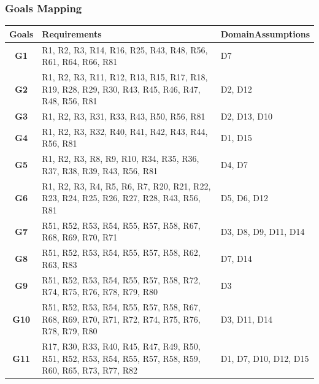\documentclass{Configuration_Files/PoliMi3i_thesis}
\begin{document}
\subsubsection{Goals Mapping}

\begin{table}[H]
    \begin{xltabular}{\textwidth}{| >{}c|X|X|}
    \hline
    \textbf{Goals}&\textbf{Requirements}&\textbf{DomainAssumptions}\T\B\\
    \hline
    \textbf{G1}
    & %
    R1, R2, R3, R14, R16, R25, R43, R48, R56, R61, R64, R66, R81
    & %
    D7\T\B\\
    \hline
    \textbf{G2}
    & %
    R1, R2, R3, R11, R12, R13, R15, R17, R18, R19, R28, R29, R30, R43, R45, R46, R47, R48, R56, R81
    & %
    D2, D12\T\B\\
    \hline
    \textbf{G3}
    & %
    R1, R2, R3, R31, R33, R43, R50, R56, R81
    & %
    D2, D13, D10 \T\B\\
    \hline
    \textbf{G4}
    & %
    R1, R2, R3, R32, R40, R41, R42, R43, R44, R56, R81
    & %
    D1, D15 \T\B\\
    \hline
    \textbf{G5}
    & %
    R1, R2, R3, R8, R9, R10, R34, R35, R36, R37, R38, R39, R43, R56, R81
    & %
    D4, D7\T\B\\
    \hline
    \textbf{G6}
    & %
    R1, R2, R3, R4, R5, R6, R7, R20, R21, R22, R23, R24, R25, R26, R27, R28, R43, R56, R81
    & %
    D5, D6, D12\T\B\\
    \hline
    \textbf{G7}
    & %
    R51, R52, R53, R54, R55, R57, R58, R67, R68, R69, R70, R71
    & %
    D3, D8, D9, D11, D14\T\B\\
    \hline
    \textbf{G8}
    & %
    R51, R52, R53, R54, R55, R57, R58, R62, R63, R83
    & %
    D7, D14 \T\B\\
    \hline
    \textbf{G9}
    & %
    R51, R52, R53, R54, R55, R57, R58, R72, R74, R75, R76, R78, R79, R80
    & %
    D3 \T\B\\
    \hline
    \textbf{G10}
    & %
    R51, R52, R53, R54, R55, R57, R58, R67, R68, R69, R70, R71, R72, R74, R75, R76, R78, R79, R80
    & %
    D3, D11, D14 \T\B\\
    \hline
    \textbf{G11}
    & %
    R17, R30, R33, R40, R45, R47, R49, R50, R51, R52, R53, R54, R55, R57, R58, R59, R60, R65, R73, R77, R82
    & %
    D1, D7, D10, D12, D15 \T\B\\
    \hline
    \end{xltabular}
\end{table}
\end{document}

